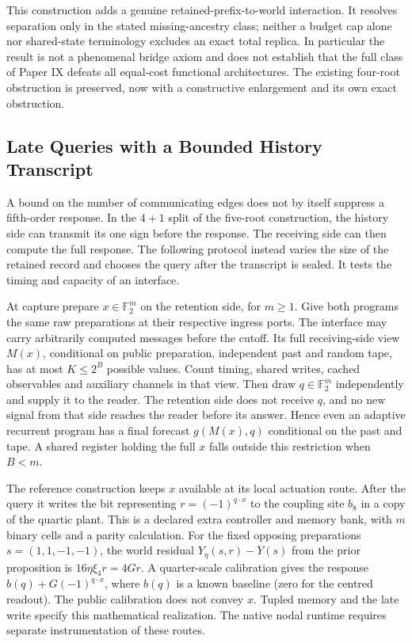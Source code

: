\documentclass[11pt,a4paper]{article}
\theoremstyle{definition}
\begin{document}
This construction adds a genuine retained-prefix-to-world interaction. It
resolves separation only in the stated missing-ancestry class; neither a
budget cap alone nor shared-state terminology excludes an exact total
replica. In particular the result is not a phenomenal bridge axiom and does
not establish that the full class of Paper IX defeats all equal-cost
functional architectures. The existing four-root obstruction is preserved,
now with a constructive enlargement and its own exact obstruction.


\subsection{Late Queries with a Bounded History Transcript}

A bound on the number of communicating edges does not by itself suppress a
fifth-order response. In the $4+1$ split of the five-root construction, the
history side can transmit its one sign before the response. The receiving side
can then compute the full response. The following protocol instead varies the
size of the retained record and chooses the query after the transcript is
sealed. It tests the timing and capacity of an interface.

At capture prepare $x\in\mathbb F_2^m$ on the retention side, for $m\ge1$.
Give both programs the same raw preparations at their respective ingress ports.
The interface may carry arbitrarily computed messages before the cutoff.
Its full receiving-side view $M(x)$, conditional on public preparation,
independent past and random tape, has at most $K\le 2^B$ possible values.
Count timing, shared writes, cached observables and auxiliary channels in
that view. Then draw $q\in\mathbb F_2^m$ independently and supply it to the
reader. The retention side does not receive $q$, and no new signal from that
side reaches the reader before its answer. Hence even an adaptive recurrent
program has a final forecast $g(M(x),q)$ conditional on the past and tape.
A shared register holding the full $x$ falls outside this restriction when
$B<m$.

The reference construction keeps $x$ available at its local actuation route.
After the query it writes the bit representing $r=(-1)^{q\cdot x}$ to the
coupling site $b_8$ in a copy of the quartic plant. This is a declared extra
controller and memory bank, with $m$ binary cells and a parity calculation.
For the fixed opposing preparations $s=(1,1,-1,-1)$, the world residual
$Y_\eta(s,r)-Y(s)$ from the prior proposition is $16\eta\xi_4 r=4Gr$.
A quarter-scale calibration gives the response $b(q)+G(-1)^{q\cdot x}$,
where $b(q)$ is a known baseline (zero for the centred readout).
The public calibration does not convey $x$. Tupled memory and the late
write specify this mathematical realization. The native nodal runtime
requires separate instrumentation of these routes.
\end{document}
